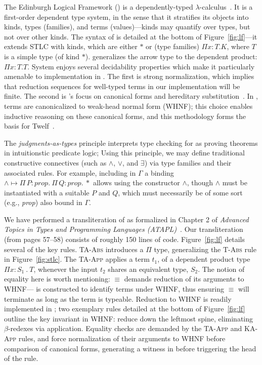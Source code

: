 The Edinburgh Logical Framework (\lf{}) is a dependently-typed
$\lambda$-calculus~\cite{Harper:93}. It is a first-order dependent
type system, in the sense that it stratifies its objects into kinds, types
(families), and terms (values)---kinds may quantify over types, but
not over other kinds. The syntax of \lf{} is detailed at the bottom of
Figure~\ref{fig:lf}---it extends STLC with kinds, which are either
$\ast$ or (type families) $\Pi x : T. K$, where $T$ is a simple type
(of kind $\ast$). \lf{} generalizes the arrow type to the dependent
product: $\Pi x: T. T$. System \lf{} enjoys several decidability
properties which make it particularly amenable to implementation in
\slog{}. The first is strong normalization, which implies that
reduction sequences for well-typed terms in our implementation will be
finite. The second is \lf{}'s focus on canonical forms and hereditary
substitution~\cite{harper:2007}. In \lf{}, terms are canonicalized to
weak-head normal form (WHNF); this choice enables inductive reasoning
on these canonical forms, and this methodology forms the basis for
Twelf~\cite{pfenning1998twelf}.

The \textit{judgments-as-types} principle interprets type checking for
\lf{} as proving theorems in intuitionstic predicate logic; Using this
principle, we may define traditional constructive connectives (such as
$\land$, $\lor$, and $\exists$) via type families and their associated
rules. For example, including in $\Gamma$ a binding $\land \mapsto
\Pi\, P : \textit{prop}.~ \Pi\, Q : \textit{prop}.~ \ast$ allows using
the constructor $\land$, though $\land$ must be instantiated with a
suitable $P$ and $Q$, which must necessarily be of some sort (e.g.,
\textit{prop}) also bound in $\Gamma$.

We have performed a transliteration of \lf{} as formalized in Chapter
2 of \textit{Advanced Topics in Types and Programming Languages
  (ATAPL)}~\cite{atapl}. Our transliteration (from pages 57--58)
consists of roughly 150 lines of \slog{}
code. Figure~\ref{fig:lf} details several of the key
rules. \textsc{TA-Abs} introduces a $\Pi$ type, generalizing the
\textsc{T-Abs} rule in Figure~\ref{fig:stlc}. The \textsc{TA-App}
applies a term $t_1$, of a dependent product type $\Pi x :S_1 ~.~T$,
whenever the input $t_2$ shares an equivalent type, $S_2$. The notion
of equality here is worth mentioning: $\equiv$ demands reduction of
its arguments to WHNF---\lf{} is constructed to identify terms under
WHNF, thus ensuring $\equiv$ will terminate as long as the term is
typeable. Reduction to WHNF is readily implemented in \slog{}; two
exemplary rules detailed at the bottom of Figure~\ref{fig:lf}
outline the key invariant in WHNF: reduce down the leftmost spine,
eliminating $\beta$-redexes via application. Equality checks are
demanded by the \textsc{TA-App} and \textsc{KA-App} rules, and force
normalization of their arguments to WHNF before comparison of
canonical forms, generating a witness in  before triggering
the head of the rule.


